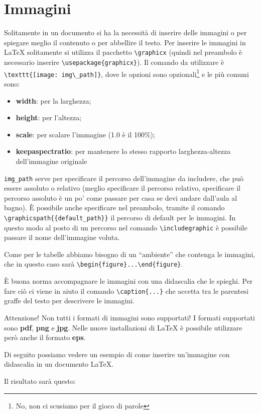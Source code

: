 \section{Immagini}
Solitamente in un documento si ha la necessità di inserire delle immagini o 
per spiegare meglio il contenuto o per abbellire il testo. Per inserire le 
immagini in \LaTeX{} solitamente si utilizza il pacchetto \verb!\graphicx! 
(quindi nel preambolo è necessario inserire \verb!\usepackage{graphicx}!). Il 
comando da utilizzare è \verb!\texttt{[image: img\_path]}!, dove le 
opzioni sono opzionali\footnote{No, non ci scusiamo per il gioco di parole} e 
le più comuni sono:
\begin{itemize}
    \item \textbf{width}: per la larghezza;
    \item \textbf{height}: per l'altezza;
    \item \textbf{scale}: per scalare l'immagine (1.0 è il 100\%);
    \item \textbf{keepaspectratio}: per mantenere lo stesso rapporto 
    larghezza-altezza dell’immagine originale
\end{itemize}
\verb!img_path! serve per specificare il percorso dell'immagine da includere, 
che può essere assoluto o relativo (meglio specificare il percorso relativo, 
specificare il percorso assoluto è un po' come passare per casa se devi andare 
dall'aula al bagno). È possibile anche specificare nel preambolo, tramite il 
comando \verb!\graphicspath{{default_path}}! il percorso di default per le 
immagini. In questo modo al posto di un percorso nel comando 
\verb!\includegraphic! è possibile passare il nome dell'immagine voluta.

Come per le tabelle abbiamo bisogno di un ``ambiente'' che contenga le 
immagini, che in questo caso sarà \verb!\begin{figure}...\end{figure}!.

È buona norma accompagnare le immagini con una didascalia che le spieghi. Per 
fare ciò ci viene in aiuto il comando \verb!\caption{...}! che accetta tra le 
parentesi graffe del testo per descrivere le immagini.

Attenzione! Non tutti i formati di immagini sono supportati! I formati 
supportati sono \textbf{pdf}, \textbf{png} e \textbf{jpg}. Nelle nuove 
installazioni di \LaTeX{} è possibile utilizzare però anche il formato \textbf{
eps}.

Di seguito possiamo vedere un esempio di come inserire un'immagine con 
didascalia in un documento \LaTeX{}.

Il risultato sarà questo:


